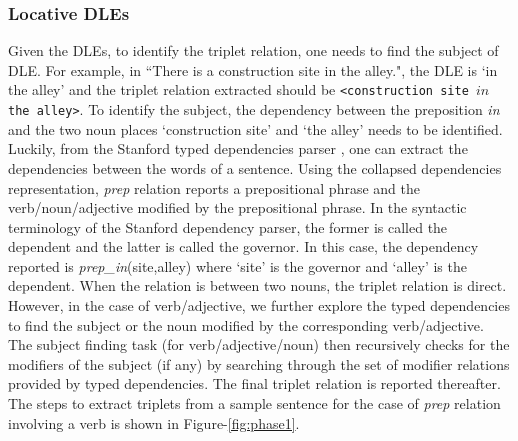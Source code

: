 \documentclass{acm_proc_article-sp}
\begin{document}
\subsubsection*{Locative DLEs}
Given the DLEs, to identify the triplet relation, one needs to find the subject of DLE. For example, in ``There is a construction site in the alley.", the DLE is `in the alley' and the triplet relation extracted should be \texttt{<construction site $in$ the alley>}. To  identify the subject, the dependency between the preposition \textit{in} and the two noun places `construction site' and `the alley' needs to be identified. Luckily, from the Stanford typed dependencies parser \cite{marneffe:stanford}, one can extract the dependencies between the words of a sentence. Using the collapsed dependencies representation, \textit{prep} relation reports a prepositional phrase and the verb/noun/adjective modified by the prepositional phrase. In the syntactic terminology of the Stanford dependency parser, the former is called the dependent and the latter is called the governor. In this case, the dependency reported is \textit{prep\_in}(site,alley) where `site' is the governor and `alley' is the dependent. When the relation is between two nouns, the triplet relation is direct. 
However, in the case of verb/adjective, we further explore the typed dependencies to find the subject or the noun modified by the corresponding verb/adjective. The subject finding task (for verb/adjective/noun) then recursively checks for the modifiers of the subject (if any) by searching through the set of modifier relations provided by typed dependencies. The final triplet relation is reported thereafter. The steps to extract triplets from a sample sentence for the case of \textit{prep} relation involving a verb is shown in Figure-\ref{fig:phase1}. 
 
\end{document}
